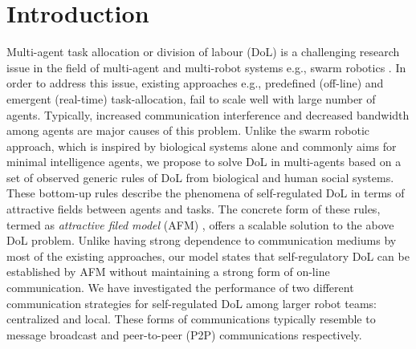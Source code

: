 \documentclass{llncs}
\begin{document}
\section{Introduction}
\label{sec:intro}
\vspace{2mm}
Multi-agent task allocation or division of labour (DoL) is a challenging research issue in the field of multi-agent and multi-robot systems e.g., swarm robotics \cite{RefSwarm}. In order to address this issue, existing approaches e.g., predefined (off-line) and emergent (real-time) task-allocation, fail to scale well with large number of agents. Typically, increased communication interference and decreased bandwidth among agents are major causes of this problem. Unlike the swarm robotic approach, which is inspired by biological systems alone and commonly aims for minimal intelligence agents, we propose to solve DoL in multi-agents based on a set of observed generic rules of DoL from biological and human social systems. These bottom-up rules describe the phenomena of self-regulated DoL in terms of attractive fields between agents and tasks. The concrete form of these rules, termed as \textit{attractive filed model} (AFM) \cite{RefElsa}, offers a scalable solution to the above DoL problem. Unlike having strong dependence to communication mediums by most of the existing approaches, our model states that self-regulatory DoL can be established by AFM without maintaining a strong form of on-line communication. 
We have investigated the performance of two different communication strategies for self-regulated DoL among larger robot teams: centralized and local. These forms of communications typically resemble to message broadcast and peer-to-peer (P2P) communications respectively. 
%
\end{document}
